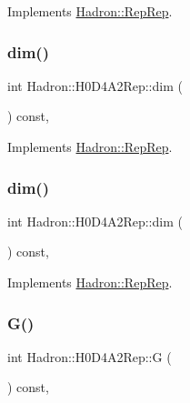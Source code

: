 Implements \mbox{\hyperlink{structHadron_1_1RepRep_a92c8802e5ed7afd7da43ccfd5b7cd92b}{Hadron\+::\+Rep\+Rep}}.

\mbox{\label{structHadron_1_1H0D4A2Rep_ab746308c018d06bc8d3e1822f84c9049}} 
\subsubsection{\texorpdfstring{dim()}{dim()}\hspace{0.1cm}{\footnotesize\ttfamily [2/3]}}
{\footnotesize\ttfamily int Hadron\+::\+H0\+D4\+A2\+Rep\+::dim (\begin{DoxyParamCaption}{ }\end{DoxyParamCaption}) const\hspace{0.3cm}{\ttfamily [inline]}, {\ttfamily [virtual]}}



Implements \mbox{\hyperlink{structHadron_1_1RepRep_a92c8802e5ed7afd7da43ccfd5b7cd92b}{Hadron\+::\+Rep\+Rep}}.

\mbox{\label{structHadron_1_1H0D4A2Rep_ab746308c018d06bc8d3e1822f84c9049}} 
\subsubsection{\texorpdfstring{dim()}{dim()}\hspace{0.1cm}{\footnotesize\ttfamily [3/3]}}
{\footnotesize\ttfamily int Hadron\+::\+H0\+D4\+A2\+Rep\+::dim (\begin{DoxyParamCaption}{ }\end{DoxyParamCaption}) const\hspace{0.3cm}{\ttfamily [inline]}, {\ttfamily [virtual]}}



Implements \mbox{\hyperlink{structHadron_1_1RepRep_a92c8802e5ed7afd7da43ccfd5b7cd92b}{Hadron\+::\+Rep\+Rep}}.

\mbox{\label{structHadron_1_1H0D4A2Rep_a637522dc6caee2869b2bb632a4c5a5b5}} 
\subsubsection{\texorpdfstring{G()}{G()}\hspace{0.1cm}{\footnotesize\ttfamily [1/2]}}
{\footnotesize\ttfamily int Hadron\+::\+H0\+D4\+A2\+Rep\+::G (\begin{DoxyParamCaption}{ }\end{DoxyParamCaption}) const\hspace{0.3cm}{\ttfamily [inline]}, {\ttfamily [virtual]}}

